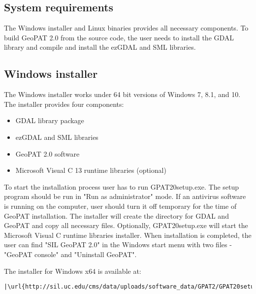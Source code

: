 \subsection{System requirements}

The Windows installer and Linux binaries provides all necessary components. 
To build GeoPAT 2.0 from the source code, the user needs to install the GDAL library and compile and install the ezGDAL and SML libraries.

\subsection{Windows installer}
The Windows installer works under 64 bit versions of Windows 7, 8.1, and 10.
The installer provides four components:
\begin{itemize}
  \item{GDAL library package}
  \item{ezGDAL and SML libraries}
  \item{GeoPAT 2.0 software}
  \item{Microsoft Visual C 13 runtime libraries (optional)}
\end{itemize}
To start the installation process user has to run GPAT20setup.exe.
The setup program should be run in "Run as administrator" mode.
If an antivirus software is running on the computer, user should turn it off temporary for the time of GeoPAT installation.
The installer will create the directory for GDAL and GeoPAT and copy all necessary files.
Optionally, GPAT20setup.exe will start the Microsoft Visual C runtime libraries installer.
When installation is completed, the user can find "SIL GeoPAT 2.0" in the Windows start menu with two files - "GeoPAT console" and "Uninstall GeoPAT".

The installer for Windows x64 is available at:

\begin{lstlisting}[escapechar=|]
|\url{http://sil.uc.edu/cms/data/uploads/software_data/GPAT2/GPAT20setup.exe}|
\end{lstlisting}

